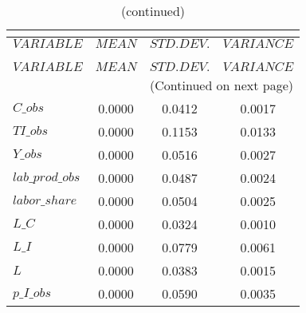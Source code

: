  
\begin{center}
\begin{longtable}{lccc} 
\caption{THEORETICAL MOMENTS}\\
 \label{Table:th_moments}\\
\toprule 
$VARIABLE        $	 & 	 $         MEAN$	 & 	 $    STD. DEV.$	 & 	 $     VARIANCE$\\
\midrule \endfirsthead 
\caption{(continued)}\\
 \toprule \\ 
$VARIABLE        $	 & 	 $         MEAN$	 & 	 $    STD. DEV.$	 & 	 $     VARIANCE$\\
\midrule \endhead 
\midrule \multicolumn{4}{r}{(Continued on next page)} \\ \bottomrule \endfoot 
\bottomrule \endlastfoot 
$C\_obs          $	 & 	       0.0000	 & 	       0.0412	 & 	       0.0017 \\ 
$TI\_obs         $	 & 	       0.0000	 & 	       0.1153	 & 	       0.0133 \\ 
$Y\_obs          $	 & 	       0.0000	 & 	       0.0516	 & 	       0.0027 \\ 
$lab\_prod\_obs  $	 & 	       0.0000	 & 	       0.0487	 & 	       0.0024 \\ 
$labor\_share    $	 & 	       0.0000	 & 	       0.0504	 & 	       0.0025 \\ 
$L\_C            $	 & 	       0.0000	 & 	       0.0324	 & 	       0.0010 \\ 
$L\_I            $	 & 	       0.0000	 & 	       0.0779	 & 	       0.0061 \\ 
$L               $	 & 	       0.0000	 & 	       0.0383	 & 	       0.0015 \\ 
$p\_I\_obs       $	 & 	       0.0000	 & 	       0.0590	 & 	       0.0035 \\ 
\end{longtable}
 \end{center}
